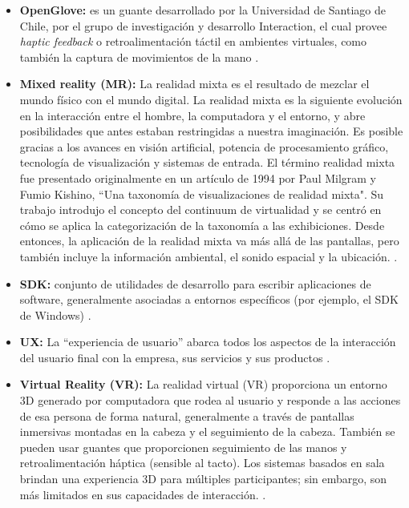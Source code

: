{\begin{itemize}
\item  \textbf{OpenGlove:} es un guante desarrollado por la Universidad de Santiago de Chile, por el grupo de investigación y desarrollo Interaction, el cual provee \textit{haptic feedback} o retroalimentación táctil en ambientes virtuales, como también la captura de movimientos de la mano \citep{openglove-info-page}.

\item \textbf{Mixed reality (MR):}  La realidad mixta es el resultado de mezclar el mundo físico con el mundo digital. La realidad mixta es la siguiente evolución en la interacción entre el hombre, la computadora y el entorno, y abre posibilidades que antes estaban restringidas a nuestra imaginación. Es posible gracias a los avances en visión artificial, potencia de procesamiento gráfico, tecnología de visualización y sistemas de entrada. El término realidad mixta fue presentado originalmente en un artículo de 1994 por Paul Milgram y Fumio Kishino, ``Una taxonomía de visualizaciones de realidad mixta". Su trabajo introdujo el concepto del continuum de virtualidad y se centró en cómo se aplica la categorización de la taxonomía a las exhibiciones. Desde entonces, la aplicación de la realidad mixta va más allá de las pantallas, pero también incluye la información ambiental, el sonido espacial y la ubicación. \citep{microsoft-MR}.

\item \textbf{SDK:} conjunto de utilidades de desarrollo para escribir aplicaciones de software, generalmente asociadas a entornos específicos (por ejemplo, el SDK de Windows) \citep{gartner-group-SDK}.

\item \textbf{UX:}	La ``experiencia de usuario'' abarca todos los aspectos de la interacción del usuario final con la empresa, sus servicios y sus productos \citep{nngroup-ux}.

\item \textbf{Virtual Reality (VR):}  La realidad virtual (VR) proporciona un entorno 3D generado por computadora que rodea al usuario y responde a las acciones de esa persona de forma natural, generalmente a través de pantallas inmersivas montadas en la cabeza y el seguimiento de la cabeza. También se pueden usar guantes que proporcionen seguimiento de las manos y retroalimentación háptica (sensible al tacto). Los sistemas basados en sala brindan una experiencia 3D para múltiples participantes; sin embargo, son más limitados en sus capacidades de interacción. \citep{gartner-group-VR}.

\end{itemize}

}